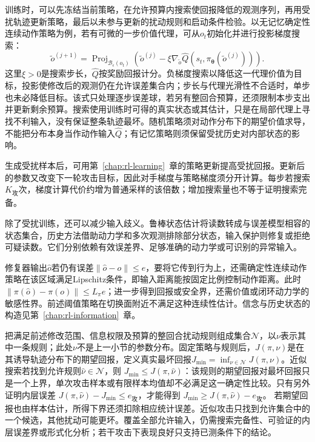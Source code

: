 训练时，可以先冻结当前策略，在允许预算内搜索使回报降低的观测序列，再用受扰轨迹更新策略，最后以未参与更新的扰动规则和启动条件检验。以无记忆确定性连续动作策略为例，若有可微的一步价值代理，可从$o_t$初始化并进行投影梯度搜索：
\[
  \widetilde o^{(j+1)}
   =\operatorname{Proj}_{\mathcal B_\epsilon(o_t)}
      \left(\widetilde o^{(j)}
       -\xi\nabla_{\widetilde o}
          \widehat Q(s_t,\pi_{\bm{\theta}}(\widetilde o^{(j)}))\right).
\]
这里$\xi>0$是搜索步长，$\widehat Q$按奖励回报计分。负梯度搜索以降低这一代理价值为目标，投影使修改后的观测仍在允许误差集合内；步长与代理光滑性不合适时，单步也未必降低目标。该式只处理逐步误差球，若另有整回合预算，还须限制本步支出并更新剩余预算。搜索使用训练时可得的真实状态或其估计，只是在局部代理上寻找不利输入，没有保证整条轨迹最坏。随机策略须对动作分布下的期望价值求导，不能把分布本身当作动作输入$\widehat Q$；有记忆策略则须保留受扰历史对内部状态的影响。

生成受扰样本后，可用第~\ref{chap:rl-learning}~章的策略更新提高受扰回报。更新后的参数又改变下一轮攻击目标，因此对手梯度与策略梯度须分开计算。每步若搜索$K_{\text{攻}}$次，梯度计算代价约增为普通采样的该倍数；增加搜索量也不等于证明搜索完备。

除了受扰训练，还可以减少输入歧义。鲁棒状态估计将读数转成与误差模型相容的状态集合，历史方法借助动力学和多次观测排除部分状态，输入保护则修复或拒绝可疑读数。它们分别依赖有效误差界、足够准确的动力学或可识别的异常输入。

修复器输出$\widehat o$若仍有误差$\|\widehat o-o\|\leq e$，要将它传到行为上，还需确定性连续动作策略在该区域满足Lipschitz条件，即输入距离能按固定比例控制动作距离。此时
$\|\pi(\widehat o)-\pi(o)\|\leq L_\pi e$；进一步得到回报或安全界，还需价值或闭环动力学的敏感性界。前述阈值策略在切换面附近不满足这种连续性估计。信念与历史状态的构造见第~\ref{chap:rl-information}~章。

把满足前述修改范围、信息权限及预算的整回合扰动规则组成集合$\mathcal N$，以$\nu$表示其中一条规则；此处$\nu$不是上一小节的参数分布。固定策略与规则后，$J(\pi,\nu)$是在其诱导轨迹分布下的期望回报，定义真实最坏回报$J_{\min}=\inf_{\nu\in\mathcal N}J(\pi,\nu)$。近似搜索若找到允许规则$\widehat\nu\in\mathcal N$，则
$J_{\min}\leq J(\pi,\widehat\nu)$：该规则的期望回报对最坏回报只是一个上界，单次攻击样本或有限样本均值却不必满足这一确定性比较。只有另外证明内层误差
$J(\pi,\widehat\nu)-J_{\min}\leq e_{\text{攻}}$，才能得到
$J_{\min}\geq J(\pi,\widehat\nu)-e_{\text{攻}}$。
若期望回报也由样本估计，所得下界还须扣除相应统计误差。近似攻击只找到允许集合中的一个候选，其他扰动可能更坏。覆盖全部允许输入，仍需搜索完备性、可验证的内层误差界或形式化分析；若干攻击下表现良好只支持已测条件下的结论。

